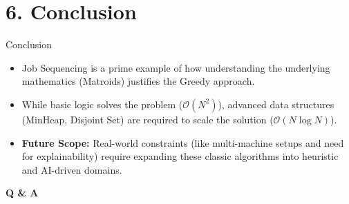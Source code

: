 \documentclass[aspectratio=169]{beamer}
\begin{document}
\section{6. Conclusion}
\begin{frame}{Conclusion}
    \begin{itemize}
        \item Job Sequencing is a prime example of how understanding the underlying mathematics (Matroids) justifies the Greedy approach.
        \item While basic logic solves the problem ($\mathcal{O}(N^2)$), advanced data structures (MinHeap, Disjoint Set) are required to scale the solution ($\mathcal{O}(N \log N)$).
        \item \textbf{Future Scope:} Real-world constraints (like multi-machine setups and need for explainability) require expanding these classic algorithms into heuristic and AI-driven domains.
    \end{itemize}
    \vspace{1cm}
    \centering \Large \textbf{Q \& A}
\end{frame}
\end{document}
